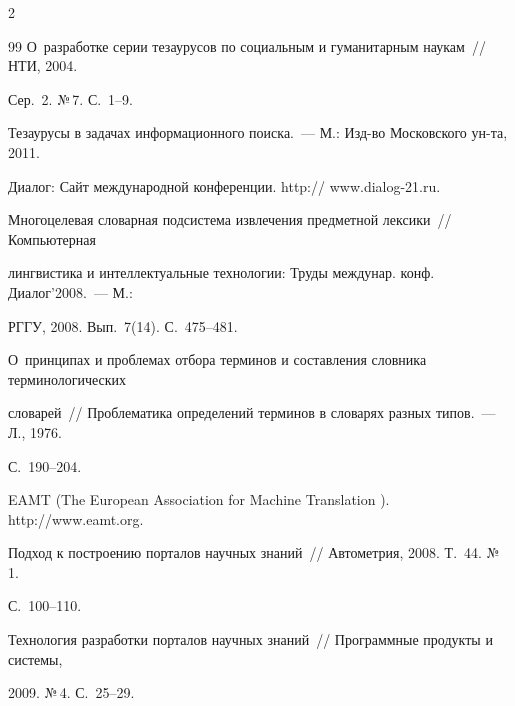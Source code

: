 \begin{multicols}{2}
{{\begin{thebibliography}{99}
   О~разработке серии тезаурусов по социальным и гуманитарным наукам~// НТИ, 2004. 

Сер.~2. №\,7. С.~1--9.

  



  Тезаурусы в задачах информационного поиска.~--- М.: Изд-во Московского ун-та, 2011.

  


  Диалог: Сайт международной конференции. {\sf http:// www.dialog-21.ru}.

  



  Многоцелевая словарная подсистема извлечения предметной лексики~// Компьютерная 

лингвистика и интеллектуальные технологии: Труды междунар. конф. Диалог'2008.~--- М.: 

РГГУ, 2008. Вып.~7(14). С.~475--481.

  



  О~принципах и проблемах отбора терминов и составления словника терминологических 

словарей~// Проблематика определений терминов в словарях разных типов.~--- Л., 1976. 

С.~190--204.

  


  EAMT (The European Association for Machine Translation ). {\sf http://www.eamt.org}.

  



  Подход к построению порталов научных знаний~// Автометрия, 2008. Т.~44. №\,1. 

  С.~100--110.

  



  Технология разработки порталов научных знаний~// Программные продукты и системы, 

2009. №\,4. С.~25--29.


\end{thebibliography}}}
\end{multicols}
